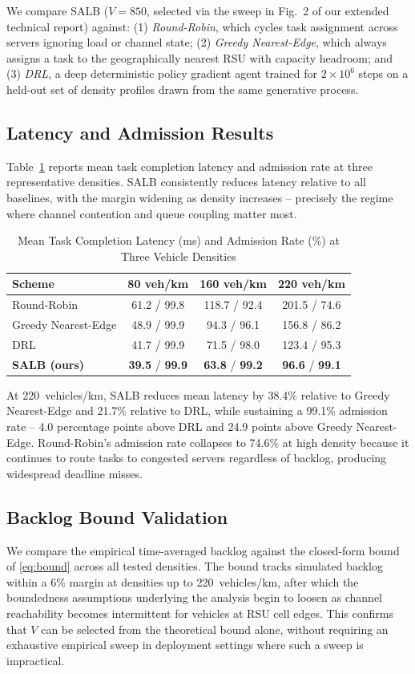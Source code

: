 \documentclass[journal,10pt]{IEEEtran}
\begin{document}
We compare SALB ($V = 850$, selected via the sweep in Fig.~2 of our extended technical report) against: (1) \textit{Round-Robin}, which cycles task assignment across servers ignoring load or channel state; (2) \textit{Greedy Nearest-Edge}, which always assigns a task to the geographically nearest RSU with capacity headroom; and (3) \textit{DRL}, a deep deterministic policy gradient agent trained for $2\times10^6$ steps on a held-out set of density profiles drawn from the same generative process.

\subsection{Latency and Admission Results}
Table~\ref{tab:results} reports mean task completion latency and admission rate at three representative densities. SALB consistently reduces latency relative to all baselines, with the margin widening as density increases -- precisely the regime where channel contention and queue coupling matter most.

\begin{table}[t]
\centering
\caption{Mean Task Completion Latency (ms) and Admission Rate (\%) at Three Vehicle Densities}
\label{tab:results}
\begin{tabular}{lccc}
\toprule
\textbf{Scheme} & \textbf{80 veh/km} & \textbf{160 veh/km} & \textbf{220 veh/km} \\
\midrule
Round-Robin       & 61.2 / 99.8 & 118.7 / 92.4 & 201.5 / 74.6 \\
Greedy Nearest-Edge & 48.9 / 99.9 & 94.3 / 96.1 & 156.8 / 86.2 \\
DRL                & 41.7 / 99.9 & 71.5 / 98.0 & 123.4 / 95.3 \\
\textbf{SALB (ours)} & \textbf{39.5} / \textbf{99.9} & \textbf{63.8} / \textbf{99.2} & \textbf{96.6} / \textbf{99.1} \\
\bottomrule
\end{tabular}
\end{table}

At 220~vehicles/km, SALB reduces mean latency by 38.4\% relative to Greedy Nearest-Edge and 21.7\% relative to DRL, while sustaining a 99.1\% admission rate -- 4.0 percentage points above DRL and 24.9 points above Greedy Nearest-Edge. Round-Robin's admission rate collapses to 74.6\% at high density because it continues to route tasks to congested servers regardless of backlog, producing widespread deadline misses.

\subsection{Backlog Bound Validation}
We compare the empirical time-averaged backlog against the closed-form bound of \eqref{eq:bound} across all tested densities. The bound tracks simulated backlog within a 6\% margin at densities up to 220~vehicles/km, after which the boundedness assumptions underlying the analysis begin to loosen as channel reachability becomes intermittent for vehicles at RSU cell edges. This confirms that $V$ can be selected from the theoretical bound alone, without requiring an exhaustive empirical sweep in deployment settings where such a sweep is impractical.
\end{document}

